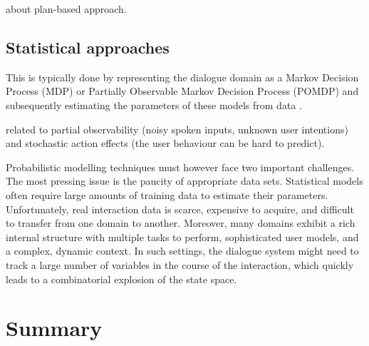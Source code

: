 \citep{Grosz:1986} about plan-based approach. 


\subsection{Statistical approaches}


This is typically done by representing the dialogue domain as a Markov Decision Process (MDP) or Partially Observable Markov Decision Process (POMDP) and subsequently estimating the parameters of these models from data \citep{Supelec270}. 

 related to partial observability (noisy spoken inputs, unknown user intentions) and stochastic action effects (the user behaviour can be hard to predict). 
 
  Probabilistic modelling techniques must however face two important challenges. The most pressing issue is the paucity of appropriate data sets.  Statistical models often require large amounts of training data to estimate their parameters. Unfortunately, real interaction data is scarce, expensive to acquire, and difficult to transfer from one domain to another.  Moreover, many domains exhibit a rich internal structure with multiple tasks to perform, sophisticated user models, and a complex, dynamic context.  In such settings, the dialogue system might need to track a large number of variables in the course of the interaction, which quickly leads to a combinatorial explosion of the state space.  
  

\section{Summary}





